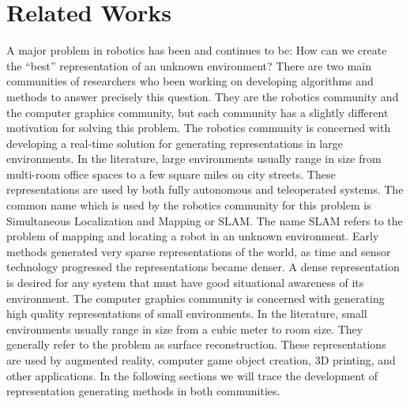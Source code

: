 \chapter{Related Works}	\label{chapter:related_works}

%


A major problem in robotics has been and continues to be: How can we create the
``best'' representation of an unknown environment? There are two main
communities of researchers who been working on developing algorithms and methods
to answer precisely this question. They are the robotics community and the
computer graphics community, but each community has a slightly different
motivation for solving this problem. The robotics community is concerned with
developing a real-time solution for generating representations in large
environments. In the literature, large environments usually range in size from
multi-room office spaces to a few square miles on city streets. These
representations are used by both fully autonomous and teleoperated systems. The
common name which is used by the robotics community for this problem is
Simultaneous Localization and Mapping or SLAM. The name SLAM refers to the
problem of mapping and locating a robot in an unknown environment. Early methods
generated very sparse representations of the world, as time and sensor
technology progressed the representations became denser. A dense representation
is desired for any system that must have good situational awareness of its
environment. The computer graphics community is concerned with generating high
quality representations of small environments. In the literature, small
environments usually range in size from a cubic meter to room size. They
generally refer to the problem as surface reconstruction. These representations
are used by augmented reality, computer game object creation, 3D printing, and
other applications. In the following sections we will trace the development of
representation generating methods in both communities.


